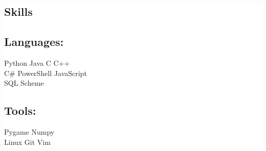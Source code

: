 \documentclass[letterpaper]{kevin-resume} %
\begin{document}
\hfill
%
%
\colorbox{background}{\hspace{4mm}\begin{minipage}[t]{0.30\textwidth} %
\hspace{5mm}

\section{Skills}

\subsection{Languages:}
Python \textbullet{}
Java \textbullet{}
C \textbullet{} 
C++ \\
C\# \textbullet{}
PowerShell \textbullet{}
JavaScript \\
SQL \textbullet{} 
Scheme

\sectionspace %

\subsection{Tools:}
Pygame \textbullet{}
Numpy \\
Linux \textbullet{}
Git \textbullet{}
Vim

\sectionspace %







\end{minipage}}
\end{document}
